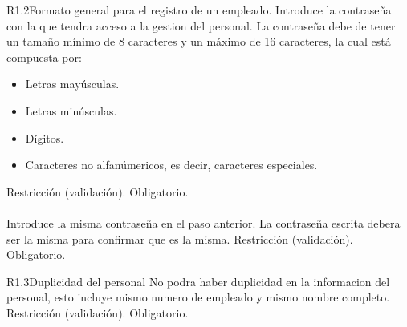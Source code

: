\begin{BussinesRule}{R1.2}{Formato general para el registro de un empleado.}
	\BRitem[Contraseña:] Introduce la contraseña con la que tendra acceso a la gestion del personal.
	\BRitem[Descripción:] La contraseña debe de tener un tamaño mínimo de 8 caracteres y un máximo de 16 caracteres, la cual está compuesta por:
		\begin{itemize}	
			\item Letras mayúsculas.
			\item Letras minúsculas.
			\item Dígitos.
			\item Caracteres no alfanúmericos, es decir, caracteres especiales.
		\end{itemize}
	\BRitem[Tipo:] Restricción (validación).
	\BRitem[Nivel:] Obligatorio.\\\\

	 Introduce la misma contraseña en el paso anterior.
	\BRitem[Descripción:] La contraseña escrita debera ser la misma para confirmar que es la misma.
	\BRitem[Tipo:] Restricción (validación).
	\BRitem[Nivel:] Obligatorio.

\end{BussinesRule}


\begin{BussinesRule}{R1.3}{Duplicidad del personal} 
	\BRitem[Descripción:] No podra haber duplicidad en la informacion del personal, esto incluye mismo numero de empleado y mismo nombre completo. 
	\BRitem[Tipo:] Restricción (validación).
	\BRitem[Nivel:] Obligatorio.
\end{BussinesRule}


